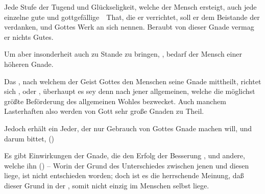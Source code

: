 \begin{aufza}
\item Jede Stufe der Tugend und Glückseligkeit, welche der Mensch ersteigt, auch jede einzelne gute und gottgefällige~\ That, die er verrichtet, soll er dem Beistande der  verdanken, und Gottes  Werk an sich nennen. Beraubt von dieser Gnade vermag er nichts Gutes.
\item Um aber insonderheit auch  zu Stande zu bringen, , bedarf der Mensch einer höheren  Gnade.
\item Das , nach welchem der Geist Gottes den Menschen seine Gnade mittheilt, richtet sich , oder , überhaupt  es sey denn nach jener allgemeinen, welche die möglichst größte Beförderung des allgemeinen Wohles bezwecket. Auch manchem Lasterhaften also werden von Gott sehr große Gnaden zu Theil.
\item Jedoch erhält ein Jeder, der nur Gebrauch von Gottes Gnade machen will, und darum bittet,  ()
\item Es gibt Einwirkungen der Gnade, die den Erfolg der Besserung , und andere, welche ihn  () -- Worin der Grund des Unterschiedes zwischen jenen und diesen liege, ist nicht entschieden worden; doch ist es die herrschende Meinung, daß dieser Grund in der , somit nicht einzig im Menschen selbst liege.
\end{aufza}

